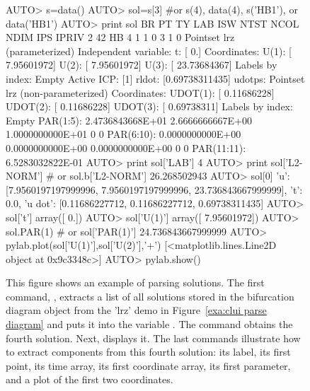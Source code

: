 \documentclass[12pt]{report}
\begin{document}
 \begin{figure}[htbp]
 {\small \begin{center} \begin{boxedverbatim}
 AUTO> s=data()
 AUTO> sol=s[3] #or s(4), data(4), s('HB1'), or data('HB1')
 AUTO> print sol 
   BR    PT  TY  LAB ISW NTST NCOL NDIM IPS IPRIV
    2    42  HB    4   1    1    0    3   1     0
 Pointset lrz (parameterized)
 Independent variable:
 t:  [ 0.]
 Coordinates:
 U(1):  [ 7.95601972]
 U(2):  [ 7.95601972]
 U(3):  [ 23.73684367]
 Labels by index: Empty
 Active ICP: [1]
 rldot: [0.69738311435]
 udotps: Pointset lrz (non-parameterized)
 Coordinates:
 UDOT(1):  [ 0.11686228]
 UDOT(2):  [ 0.11686228]
 UDOT(3):  [ 0.69738311]
 Labels by index: Empty
 PAR(1:5):      2.4736843668E+01   2.6666666667E+00   1.0000000000E+01   0   0
 PAR(6:10):     0.0000000000E+00   0.0000000000E+00   0.0000000000E+00   0   0
 PAR(11:11):    6.5283032822E-01
 AUTO> print sol['LAB']
 4
 AUTO> print sol['L2-NORM'] # or sol.b['L2-NORM']
 26.268502943
 AUTO> sol[0]
 {'u': [7.9560197197999996, 7.9560197197999996, 23.736843667999999],
   't': 0.0, 'u dot': [0.11686227712, 0.11686227712, 0.69738311435]}
 AUTO> sol['t']
 array([ 0.])
 AUTO> sol['U(1)']
 array([ 7.95601972])
 AUTO> sol.PAR(1) # or sol['PAR(1)']
 24.736843667999999
 AUTO> pylab.plot(sol['U(1)'],sol['U(2)'],'+')
 [<matplotlib.lines.Line2D object at 0x9c3348c>]
 AUTO> pylab.show()
 \end{boxedverbatim}
 \end{center} 
 }
 \caption[An example of parsing solutions.]
 {This figure shows an example of parsing solutions.
 The first command, , extracts a list of all solutions
 stored in the bifurcation diagram object  from the
 'lrz' demo in Figure~\ref{exa:clui parse diagram}
 and puts it into the variable .
 The command  obtains the fourth solution.
 Next,  displays it.
 The last commands illustrate how to extract components from
 this fourth solution: its label, its first point, its time array, its first
 coordinate array, its first parameter, and a plot of the first two
 coordinates.
 }
 \label{exa:clui parse solution}
 \end{figure}
\end{document}
